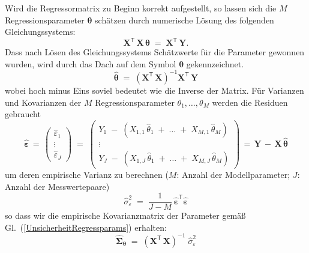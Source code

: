 Wird die Regressormatrix zu Beginn korrekt aufgestellt, so lassen sich die
$M$ Regressionsparameter $\boldsymbol{\theta}$
schätzen durch numerische Lösung des folgenden Gleichungssystems:
\begin{equation}
\mathbf{X}^\mathsf{T} \, \mathbf{X} \, \boldsymbol{\theta} \; = \;
\mathbf{X}^\mathsf{T} \, \mathbf{Y} .
\label{LsgRegressionGlSys}
\end{equation}
Dass nach Lösen des Gleichungssystems Schätzwerte für
die Parameter gewonnen wurden, wird durch das Dach auf dem Symbol $\boldsymbol{\theta}$ gekennzeichnet.
\begin{equation}
 \boldsymbol{\hat \theta} \; = \;
\left( \mathbf{X}^\mathsf{T}  \, \mathbf{X} \right)^{-1} \mathbf{X}^\mathsf{T} \, \mathbf{Y}
\label{eq_Bestimmung_von_hat_theta}
\end{equation}
wobei hoch minus Eins soviel bedeutet wie die Inverse der Matrix.
Für Varianzen und Kovarianzen der $M$ Regressionsparameter $\theta_1, \dots, \theta_M$
werden die Residuen gebraucht
\begin{equation}
\boldsymbol{\hat \varepsilon} \, =  \, \left(
\begin{array}{c}
\hat \varepsilon_1\\
\vdots \\
\hat \varepsilon_J
\end{array}
\right)  \; = \;
\left(
\begin{array}{c}
 Y_{1} \; - \; (X_{1,1} \, \hat \theta_1  \; + \; \dots  \; + \;  X_{M,1} \, \hat \theta_{M})\\
\vdots \\
 Y_{J} \; - \; (X_{1,J} \, \hat \theta_1 \; + \; \dots  \; + \;  X_{M,J} \, \hat \theta_{M})
\end{array}
\right) \, = \,
\mathbf{Y} \, -  \, \mathbf{X} \, \boldsymbol{\hat \theta}
\end{equation}
um deren empirische Varianz zu berechnen ($M$: Anzahl der Modellparameter; $J$: Anzahl der
Messwertepaare)
\begin{equation}
\hat \sigma_{\varepsilon}^2 \; = \;
\frac{1}{J-M} \, \boldsymbol{\hat \varepsilon}^\mathsf{T} \boldsymbol{\hat \varepsilon}
\end{equation}
so dass wir die empirische Kovarianzmatrix der Parameter gemäß Gl.~(\ref{UnsicherheitRegressparams}) erhalten:
\begin{equation}
\boldsymbol{\hat \Sigma}_{\boldsymbol{\theta}} \; = \;
\left( \mathbf{X}^\mathsf{T}  \, \mathbf{X} \right)^{-1} \;
\hat \sigma_{\varepsilon}^2
\label{eq:CovRegressparamsMatrix}
\end{equation}
